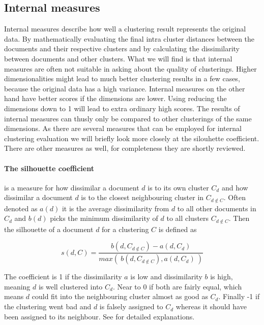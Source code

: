   \subsection{Internal measures}
  \label{sec:internal_measures}

    Internal measures describe how well a clustering result represents the original data. By mathematically evaluating the final intra cluster distances between the documents and their respective clusters and by calculating the dissimilarity between documents and other clusters. What we will find is that internal measures are often not suitable in asking about the quality of clusterings. Higher dimensionalities might lead to much better clustering results in a few cases, because the original data has a high variance. Internal measures on the other hand have better scores if the dimensions are lower. Using \lsa{} reducing the dimensions down to 1 will lead to extra ordinary high scores. The results of internal measures can thusly only be compared to other clusterings of the same dimensions. As there are several measures that can be employed for internal clustering evaluation we will briefly look more closely at the silouhette coefficient. There are other measures as well, for completeness they are shortly reviewed.

    \paragraph{The silhouette coefficient} is a measure for how dissimilar a document $d$ is to its own cluster $C_d$ and how dissimilar a document $d$ is to the closest neighbouring cluster in $C_{d \not \in C}$. Often denoted as $a(d)$ it is the average dissimilarity from $d$ to all other documents in $C_d$ and $b(d)$ picks the minimum dissimilarity of $d$ to all clusters $C_{d \not \in C}$. Then the silhouette of a document $d$ for a clustering $C$ is defined as

      \begin{equation}
        s(d, C) = \frac{b(d, C_{d \not \in C}) - a(d, C_d)}{max(\:b(d, C_{d \not \in C}), a(d, C_d)\:)}
      \end{equation} 

    The coefficient is 1 if the dissimilarity $a$ is low and dissimilarity $b$ is high, meaning $d$ is well clustered into $C_d$. Near to 0 if both are fairly equal, which means $d$ could fit into the neighbouring cluster almost as good as $C_d$. Finally -1 if the clustering went bad and $d$ is falsely assigned to $C_d$ whereas it should have been assigned to its neighbour. See \cite{Silhouettes1987} for detailed explanations.

